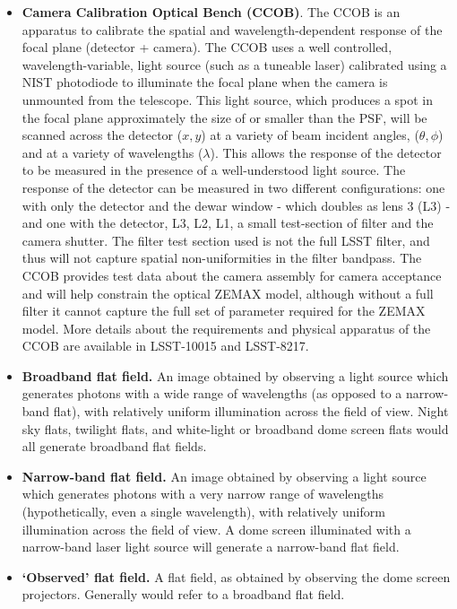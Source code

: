 \documentclass[12pt,preprint]{aastex}
\begin{document}
\begin{itemize}
\item{{\bf Camera Calibration Optical Bench (CCOB)}. The CCOB is an
apparatus to calibrate the spatial and wavelength-dependent response
of the focal plane (detector + camera). The CCOB uses a well
controlled, wavelength-variable, light source (such as a tuneable
laser) calibrated using a NIST photodiode to illuminate the focal
plane when the camera is unmounted from the telescope. This light
source, which produces a spot in the focal plane approximately the
size of or smaller than the PSF, will be scanned across the detector
($x,y$) at a variety of beam incident angles, ($\theta,\phi$) and at a
variety of wavelengths ($\lambda$).  This allows the response of the
detector to be measured in the presence of a well-understood light
source.  The response of the detector can be measured in two different
configurations: one with only the detector and the dewar window -
which doubles as lens 3 (L3) - and one with the detector, L3, L2, L1,
a small test-section of filter and the camera shutter.  The filter
test section used is not the full LSST filter, and thus will not
capture spatial non-uniformities in the filter bandpass.  The CCOB
provides test data about the camera assembly for camera acceptance and
will help constrain the optical ZEMAX model, although without a full
filter it cannot capture the full set of parameter required for the
ZEMAX model. More details about the requirements and physical apparatus of
the CCOB are available in LSST-10015 and LSST-8217.}

\item{{\bf Broadband flat field.} An image obtained by observing a
light source which generates photons with a wide range of wavelengths
(as opposed to a narrow-band flat), with relatively uniform
illumination across the field of view. Night sky flats, twilight
flats, and white-light or broadband dome screen flats would all
generate broadband flat fields.}

\item{{\bf Narrow-band flat field.} An image obtained by
    observing a light source which generates photons with a very
    narrow range of wavelengths (hypothetically, even a single
    wavelength), with relatively uniform illumination across the field
    of view. A dome screen illuminated with a narrow-band laser light
    source will generate a narrow-band flat field. }

\item{{\bf `Observed' flat field.} A flat field, as obtained by
    observing the dome screen projectors. Generally would refer to a
    broadband flat field.}


\end{itemize}
\end{document}
